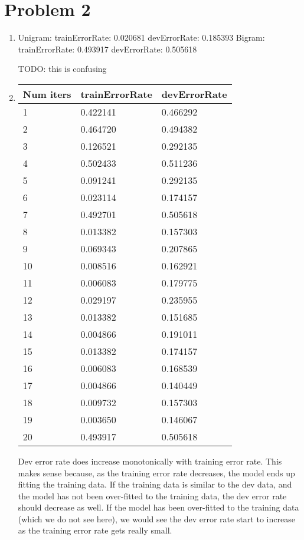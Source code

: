 \documentclass[12pt]{article}
\begin{document}
\section*{Problem 2}

\begin{enumerate}[label=(\alph*)]
  \item 
  Unigram:
  trainErrorRate: 0.020681
  devErrorRate: 0.185393
  Bigram:
  trainErrorRate: 0.493917
  devErrorRate: 0.505618

  TODO: this is confusing
  \item
  \begin{tabular}{ l | p{3cm} | p{3cm} }
    \hline
    Num iters & trainErrorRate & devErrorRate\\ \hline
    1 & 0.422141 & 0.466292 \\ \hline
    2 & 0.464720 & 0.494382 \\ \hline
    3 & 0.126521 & 0.292135 \\ \hline
    4 & 0.502433 & 0.511236 \\ \hline
    5 & 0.091241 & 0.292135 \\ \hline
    6 & 0.023114 & 0.174157 \\ \hline
    7 & 0.492701 & 0.505618 \\ \hline
    8 & 0.013382 & 0.157303 \\ \hline
    9 & 0.069343 & 0.207865 \\ \hline
    10 & 0.008516 & 0.162921 \\ \hline
    11 & 0.006083 & 0.179775 \\ \hline
    12 & 0.029197 & 0.235955 \\ \hline
    13 & 0.013382 & 0.151685 \\ \hline
    14 & 0.004866 & 0.191011 \\ \hline
    15 & 0.013382 & 0.174157 \\ \hline
    16 & 0.006083 & 0.168539 \\ \hline
    17 & 0.004866 & 0.140449 \\ \hline
    18 & 0.009732 & 0.157303 \\ \hline
    19 & 0.003650 & 0.146067 \\ \hline
    20 & 0.493917 & 0.505618 \\ \hline
  \end{tabular}

    Dev error rate does increase monotonically with training error rate. This makes sense because, as the training error rate decreases, the model ends up fitting the training data. If the training data is similar to the dev data, and the model has not been over-fitted to the training data, the dev error rate should decrease as well. If the model has been over-fitted to the training data (which we do not see here), we would see the dev error rate start to increase as the training error rate gets really small. 

\end{enumerate}
\end{document}
